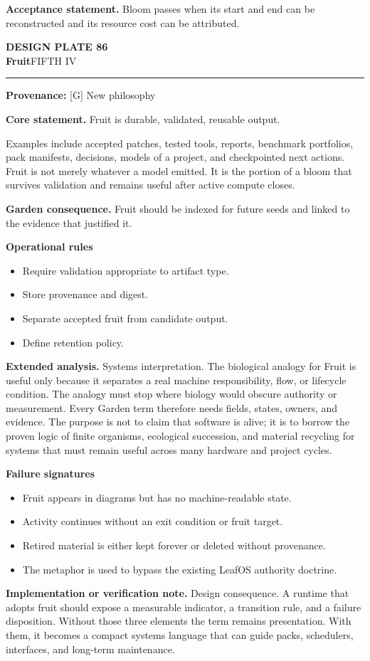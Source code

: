 \documentclass[10pt,letterpaper,oneside]{article}
\newcommand{\prov}[1]{\textcolor{gardenBlue}{\sffamily\footnotesize\textbf{Provenance:} #1}}
\newcommand{\platetitle}[3]{%
  \begin{minipage}[t][0.54in][t]{\textwidth}
  {\sffamily\bfseries\color{gardenDeep}\fontsize{9}{10}\selectfont DESIGN PLATE #1}\\[-1pt]
  {\sffamily\bfseries\color{gardenInk}\fontsize{16.5}{18}\selectfont #2}\hfill{\sffamily\color{gardenGreen}\large #3}
  \end{minipage}\vspace{-2pt}\hrule\vspace{5pt}}
\begin{document}
\begin{acceptbox}
\textbf{Acceptance statement.} Bloom passes when its start and end can be reconstructed and its resource cost can be attributed.
\end{acceptbox}
\newpage
\platetitle{86}{Fruit}{FIFTH IV}
\prov{[G] New philosophy}
\fontsize{8.85}{10.45}\selectfont
\begin{corebox}
\textbf{Core statement.} Fruit is durable, validated, reusable output.
\end{corebox}
Examples include accepted patches, tested tools, reports, benchmark portfolios, pack manifests, decisions, models of a project, and checkpointed next actions. Fruit is not merely whatever a model emitted. It is the portion of a bloom that survives validation and remains useful after active compute closes.

\textbf{Garden consequence.} Fruit should be indexed for future seeds and linked to the evidence that justified it.

\textbf{Operational rules}
\begin{itemize}
\item Require validation appropriate to artifact type.
\item Store provenance and digest.
\item Separate accepted fruit from candidate output.
\item Define retention policy.
\end{itemize}
\textbf{Extended analysis.} Systems interpretation. The biological analogy for Fruit is useful only because it separates a real machine responsibility, flow, or lifecycle condition. The analogy must stop where biology would obscure authority or measurement. Every Garden term therefore needs fields, states, owners, and evidence. The purpose is not to claim that software is alive; it is to borrow the proven logic of finite organisms, ecological succession, and material recycling for systems that must remain useful across many hardware and project cycles.

\textbf{Failure signatures}
\begin{itemize}
\item Fruit appears in diagrams but has no machine-readable state.
\item Activity continues without an exit condition or fruit target.
\item Retired material is either kept forever or deleted without provenance.
\item The metaphor is used to bypass the existing LeafOS authority doctrine.
\end{itemize}
\textbf{Implementation or verification note.} Design consequence. A runtime that adopts fruit should expose a measurable indicator, a transition rule, and a failure disposition. Without those three elements the term remains presentation. With them, it becomes a compact systems language that can guide packs, schedulers, interfaces, and long-term maintenance.
\end{document}
